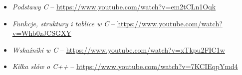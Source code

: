 % 
% 
% 
% 

\begin{itemize}
\item \emph{Podstawy C} – \url{https://www.youtube.com/watch?v=em2tCLn1Oqk}
\item \emph{Funkcje, struktury i tablice w C} – \url{https://www.youtube.com/watch?v=Whb0zJCSGXY}
\item \emph{Wskaźniki w C} – \url{https://www.youtube.com/watch?v=xTkpu2FIC1w}
\item \emph{Kilka słów o C++} – \url{https://www.youtube.com/watch?v=7KCIEqpYmd4}
\end{itemize}
